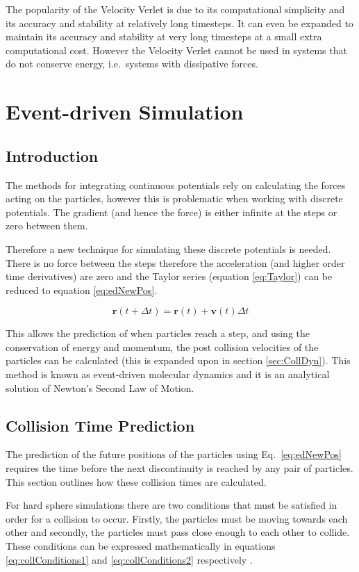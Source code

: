 \documentclass[12pt]{UoAthesis}
\begin{document}
The popularity of the Velocity Verlet is due to its computational
simplicity and its accuracy and stability at relatively long
timesteps. It can even be expanded \cite{Khakimov2002} to maintain its
accuracy and stability at very long timesteps at a small extra
computational cost. However the Velocity Verlet cannot be used in
systems that do not conserve energy, i.e.\ systems with dissipative
forces.
\section{Event-driven Simulation}

\subsection{Introduction} 
The methods for integrating continuous potentials rely on calculating
the forces acting on the particles, however this is problematic when
working with discrete potentials.  The gradient (and hence the force) is
either infinite at the steps or zero between them.

Therefore a new technique for simulating these discrete potentials is
needed.  There is no force between the steps therefore the
acceleration (and higher order time derivatives) are zero and the
Taylor series (equation \eqref{eq:Taylor}) can be reduced to equation
\eqref{eq:edNewPos}.  

\begin{equation}
  \mathbf{r}(t+\Delta t) = \mathbf{r}(t) + \mathbf{v}(t)\Delta t 
  \label{eq:edNewPos}
\end{equation}

This allows the prediction of when particles reach a step, and using
the conservation of energy and momentum, the post collision velocities
of the particles can be calculated (this is expanded upon in section
\ref{sec:CollDyn}).  This method is known as event-driven molecular
dynamics and it is an analytical solution of Newton's Second Law of
Motion.

\subsection{Collision Time Prediction}
The prediction of the future positions of the particles using
Eq.~\eqref{eq:edNewPos} requires the time before the next
discontinuity is reached by any pair of particles. This section
outlines how these collision times are calculated.

For hard sphere simulations there are two conditions that must be
satisfied in order for a collision to occur.  Firstly, the particles
must be moving towards each other and secondly, the particles must
pass close enough to each other to collide.  These conditions can be
expressed mathematically in equations \eqref{eq:collConditions1} and
\eqref{eq:collConditions2} respectively \cite{Haile1997}.
\end{document}
